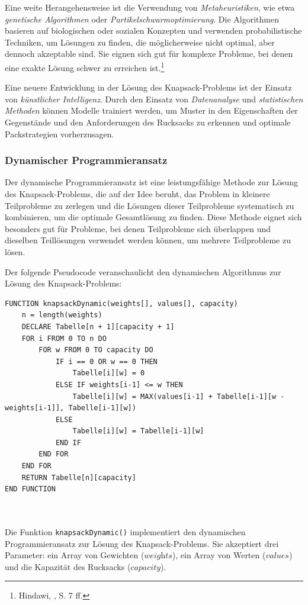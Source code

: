 Eine weite Herangehensweise ist die Verwendung von \textit{Metaheuristiken}, wie etwa \textit{genetische Algorithmen}
oder \textit{Partikelschwarmoptimierung}. Die Algorithmen basieren auf biologischen oder sozialen Konzepten und verwenden
probabilistische Techniken, um Lösungen zu finden, die möglicherweise nicht optimal, aber dennoch akzeptable sind. Sie
eignen sich gut für komplexe Probleme, bei denen eine exakte Lösung schwer zu erreichen ist.\footnote{Hindawi, \cite{Solving the 0/1 Knapsack Problem Using Metaheuristic and Neural Networks}, S. 7 ff.}

Eine neuere Entwicklung in der Lösung des Knapsack-Problems ist der Einsatz von \textit{künstlicher Intelligenz}. Durch
den Einsatz von \textit{Datenanalyse} und \textit{statistischen Methoden} können Modelle trainiert werden, um Muster in
den Eigenschaften der Gegenstände und den Anforderungen des  Rucksacks zu erkennen und optimale Packstrategien vorherzusagen.

\subsubsection{Dynamischer Programmieransatz}
Der dynamische Programmieransatz ist eine leistungsfähige Methode zur Lösung des Knapsack-Problems, die auf der Idee beruht,
das Problem in kleinere Teilprobleme zu zerlegen und die Lösungen dieser Teilprobleme systematisch zu kombinieren, um die
optimale Gesamtlösung zu finden. Diese Methode eignet sich besonders gut für Probleme, bei denen Teilprobleme sich überlappen
und dieselben Teillösungen verwendet werden können, um mehrere Teilprobleme zu lösen.

Der folgende Pseudocode veranschaulicht den dynamischen Algorithmus zur Lösung des Knapsack-Problems:
\begin{lstlisting}[style=csharp, caption={Dynamischer Algorithmus}]
FUNCTION knapsackDynamic(weights[], values[], capacity)
    n = length(weights)
    DECLARE Tabelle[n + 1][capacity + 1]
    FOR i FROM 0 TO n DO
        FOR w FROM 0 TO capacity DO
            IF i == 0 OR w == 0 THEN
                Tabelle[i][w] = 0
            ELSE IF weights[i-1] <= w THEN
                Tabelle[i][w] = MAX(values[i-1] + Tabelle[i-1][w - weights[i-1]], Tabelle[i-1][w])
            ELSE
                Tabelle[i][w] = Tabelle[i-1][w]
            END IF
        END FOR
    END FOR
    RETURN Tabelle[n][capacity]
END FUNCTION
\end{lstlisting}\\
\\
Die Funktion \texttt{knapsackDynamic()} implementiert den dynamischen Programmieransatz zur Lösung des Knapsack-Problems.
Sie akzeptiert drei Parameter: ein Array von Gewichten (\( \textit{weights} \)), ein Array von Werten (\( \textit{values} \))
und die Kapazität des Rucksacks (\( \textit{capacity} \)).

